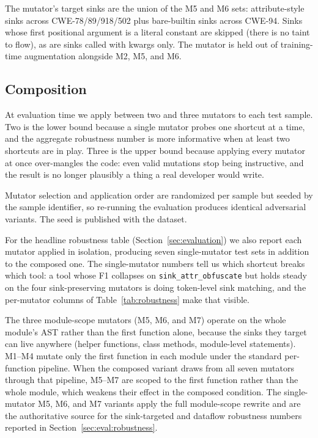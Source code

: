 The mutator's target sinks are the union of the M5 and M6 sets:
attribute-style sinks across CWE-78/89/918/502 plus bare-builtin
sinks across CWE-94. Sinks whose first positional argument is a
literal constant are skipped (there is no taint to flow), as are
sinks called with kwargs only. The mutator is held out of
training-time augmentation alongside M2, M5, and M6.

\subsection{Composition}
\label{sec:method:composition}

At evaluation time we apply between two and three mutators to each
test sample. Two is the lower bound because a single mutator probes
one shortcut at a time, and the aggregate robustness number is more
informative when at least two shortcuts are in play. Three is the
upper bound because applying every mutator at once over-mangles the
code: even valid mutations stop being instructive, and the result
is no longer plausibly a thing a real developer would write.

Mutator selection and application order are randomized per sample
but seeded by the sample identifier, so re-running the evaluation
produces identical adversarial variants. The seed is published with
the dataset.

For the headline robustness table (Section~\ref{sec:evaluation}) we
also report each mutator applied in isolation, producing seven
single-mutator test sets in addition to the composed one. The
single-mutator numbers tell us which shortcut breaks which tool: a
tool whose F1 collapses on \texttt{sink\_attr\_obfuscate} but holds
steady on the four sink-preserving mutators is doing token-level
sink matching, and the per-mutator columns of
Table~\ref{tab:robustness} make that visible.

The three module-scope mutators (M5, M6, and M7) operate on the
whole module's AST rather than the first function alone, because
the sinks they target can live anywhere (helper functions, class
methods, module-level statements). M1--M4 mutate only the first
function in each module under the standard per-function pipeline.
When the composed variant draws from all seven mutators through
that pipeline, M5--M7 are scoped to the first function rather
than the whole module, which weakens their effect in the composed
condition. The single-mutator M5, M6, and M7 variants apply the
full module-scope rewrite and are the authoritative source for the
sink-targeted and dataflow robustness numbers reported in
Section~\ref{sec:eval:robustness}.

